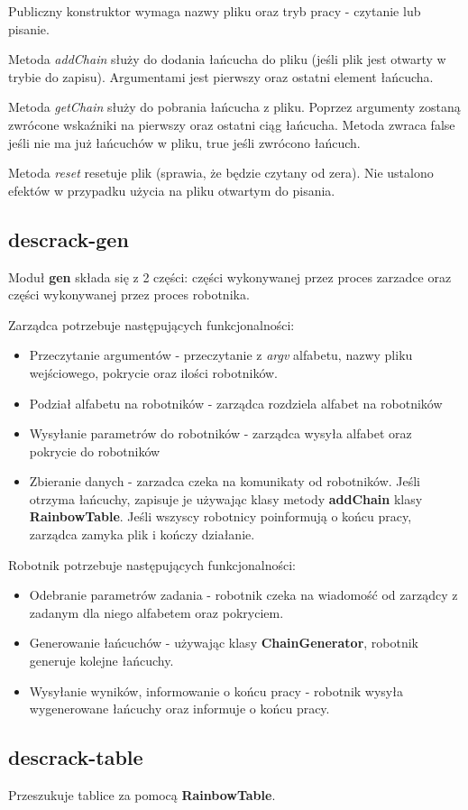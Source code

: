 \documentclass[a4paper,11pt]{article}
\begin{document}
Publiczny konstruktor wymaga nazwy pliku oraz tryb pracy - czytanie lub pisanie.

Metoda \emph{addChain} służy do dodania łańcucha do pliku (jeśli plik jest otwarty w trybie do zapisu). Argumentami jest pierwszy oraz ostatni element łańcucha.

Metoda \emph{getChain} służy do pobrania łańcucha z pliku. Poprzez argumenty zostaną zwrócone wskaźniki na pierwszy oraz ostatni ciąg łańcucha. Metoda zwraca false jeśli nie ma już łańcuchów w pliku, true jeśli zwrócono łańcuch.

Metoda \emph{reset} resetuje plik (sprawia, że będzie czytany od zera). Nie ustalono efektów w przypadku użycia na pliku otwartym do pisania.

\subsection{descrack-gen}

Moduł \textbf{gen} składa się z 2 części: części wykonywanej przez proces zarzadce oraz części wykonywanej przez proces robotnika.

Zarządca potrzebuje następujących funkcjonalności:
\begin{itemize}
	\item Przeczytanie argumentów - przeczytanie z \emph{argv} alfabetu, nazwy pliku wejściowego, pokrycie oraz ilości robotników.
	\item Podział alfabetu na robotników - zarządca rozdziela alfabet na robotników
	\item Wysyłanie parametrów do robotników - zarządca wysyła alfabet oraz pokrycie do robotników
	\item Zbieranie danych - zarzadca czeka na komunikaty od robotników. Jeśli otrzyma łańcuchy, zapisuje je używając klasy metody \textbf{addChain} klasy \textbf{RainbowTable}. Jeśli wszyscy robotnicy poinformują o końcu pracy, zarządca zamyka plik i kończy działanie.
\end{itemize}

Robotnik potrzebuje następujących funkcjonalności:
\begin{itemize}
	\item Odebranie parametrów zadania - robotnik czeka na wiadomość od zarządcy z zadanym dla niego alfabetem oraz pokryciem.
	\item Generowanie łańcuchów - używając klasy \textbf{ChainGenerator}, robotnik generuje kolejne łańcuchy.
	\item Wysyłanie wyników, informowanie o końcu pracy - robotnik wysyła wygenerowane łańcuchy oraz informuje o końcu pracy.
\end{itemize}

\subsection{descrack-table}

Przeszukuje tablice za pomocą \textbf{RainbowTable}.
\end{document}
